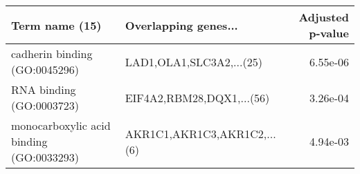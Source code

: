 \begin{tabular}{llr}
\toprule
                          Term name (15) &        Overlapping genes... &  Adjusted p-value \\
\midrule
           cadherin binding (GO:0045296) &    LAD1,OLA1,SLC3A2,...(25) &          6.55e-06 \\
                RNA binding (GO:0003723) &   EIF4A2,RBM28,DQX1,...(56) &          3.26e-04 \\
monocarboxylic acid binding (GO:0033293) & AKR1C1,AKR1C3,AKR1C2,...(6) &          4.94e-03 \\
\bottomrule
\end{tabular}
